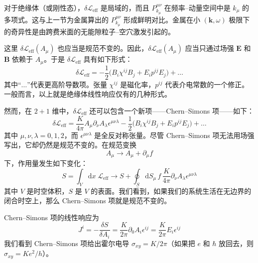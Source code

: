 对于绝缘体（或刚性态），$\delta\mathcal{L}_{\mathrm{eff}}$ 是局域的，而且 $P^{\mu\nu}_{k_{\mu}}$ 在频率--动量空间中是 $k_{\mu}$ 的多项式。这与上一节为金属算出的 $P^{\mu\nu}_{k_{\mu}}$ 形成鲜明对比。金属在小 $(\pmb{k}, \omega)$ 极限下的奇异性是由跨费米面的无能隙粒子--空穴激发引起的。

这里 $\delta\mathcal{L}_{\mathrm{eff}}(A_{\mu})$ 也应当是规范不变的。因此，$\delta\mathcal{L}_{\mathrm{eff}}(A_{\mu})$ 应当只通过场强 $\pmb{E}$ 和 $\pmb{B}$ 依赖于 $A_{\mu}$。于是 $\delta\mathcal{L}_{\mathrm{eff}}$ 具有如下形式：
\begin{equation*}
\delta\mathcal{L}_{\mathrm{eff}} = -\frac{1}{2} \big( B_{i} \chi^{ij} B_{j} + E_{i} p^{ij} E_{j} \big) + \dots
\end{equation*}
其中``$\dots$''代表更高阶导数项。张量 $\chi^{ij}$ 是磁化率，$p^{ij}$ 代表介电常数的一个修正。一般而言，以上就是绝缘体线性响应仅有的几种形式。

然而，在 $2+1$ 维中，$\delta\mathcal{L}_{\mathrm{eff}}$ 还可以包含一个新项——Chern--Simons 项——如下：
\begin{equation*}
\delta\mathcal{L}_{\mathrm{eff}} = \frac{K}{4\pi} A_{\mu} \partial_{\nu} A_{\lambda} \epsilon^{\mu\nu\lambda} - \frac{1}{2} \big( B_{i} \chi^{ij} B_{j} + E_{i} p^{ij} E_{j} \big) + \dots
\end{equation*}
其中 $\mu, \nu, \lambda = 0, 1, 2$，而 $\epsilon^{\mu\nu\lambda}$ 是全反对称张量。尽管 Chern--Simons 项无法用场强写出，它却仍然是规范不变的。在规范变换
\begin{equation*}
A_{\mu} \to A_{\mu} + \partial_{\mu} f
\end{equation*}
下，作用量发生如下变化：
\begin{equation*}
S = \int_{V} \mathrm{d}x\; \mathcal{L}_{\mathrm{eff}} \to S + \oint_{S} \mathrm{d}S_{\mu}\, f\, \frac{K}{4\pi} \partial_{\nu} A_{\lambda} \epsilon^{\mu\nu\lambda}
\end{equation*}
其中 $V$ 是时空体积，$S$ 是 $V$ 的表面。我们看到，如果我们的系统生活在无边界的闭合时空上，那么 Chern--Simons 项就是规范不变的。

Chern--Simons 项的线性响应为
\begin{equation*}
J^{i} = -\frac{\delta S}{\delta A_{i}} = \frac{K}{2\pi} \partial_{0} A_{i} \epsilon^{ij} = \frac{K}{2\pi} E_{i} \epsilon^{ij}
\end{equation*}
我们看到 Chern--Simons 项给出霍尔电导 $\sigma_{xy} = K/2\pi$（如果把 $e$ 和 $\hbar$ 放回去，则 $\sigma_{xy} = Ke^{2}/h$）。


